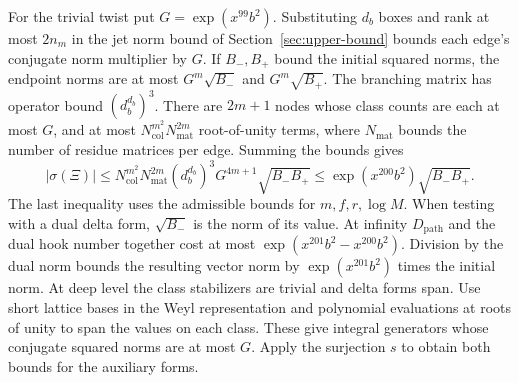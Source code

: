 For the trivial twist put \(G=\exp(x^{99}b^2)\).
Substituting \(d_b\) boxes and rank at most \(2n_m\) in the jet norm
bound of Section~\ref{sec:upper-bound} bounds each edge's conjugate
norm multiplier by \(G\). If \(B_-,B_+\) bound the initial squared
norms, the endpoint norms are at most \(G^m\sqrt{B_-}\) and
\(G^m\sqrt{B_+}\). The branching matrix has operator bound
\((d_b^{d_b})^3\). There are \(2m+1\) nodes whose class counts are
each at most \(G\), and at most \(N_\mathrm{col}^{m^2}N_\mathrm{mat}^{2m}\)
root-of-unity terms, where \(N_\mathrm{mat}\) bounds the number of
residue matrices per edge. Summing the bounds gives
\[
 |\sigma(\Xi)|\le
 N_\mathrm{col}^{m^2}N_\mathrm{mat}^{2m}(d_b^{d_b})^3G^{4m+1}\sqrt{B_-B_+}
 \le\exp(x^{200}b^2)\sqrt{B_-B_+}.
\]
The last inequality uses the admissible bounds for \(m,f,r,\log M\).
When testing with a dual delta form, \(\sqrt{B_-}\) is the norm of
its value. At infinity \(D_\mathrm{path}\) and the dual hook number
together cost at most \(\exp(x^{201}b^2-x^{200}b^2)\).
Division by the dual norm bounds the resulting vector norm by
\(\exp(x^{201}b^2)\) times the initial norm.
At deep level the class stabilizers are trivial and delta forms
span. Use short lattice bases in the Weyl representation and
polynomial evaluations at roots of unity to span the values on
each class. These give integral generators whose conjugate
squared norms are at most \(G\). Apply the surjection \(s\) to
obtain both bounds for the auxiliary forms.
